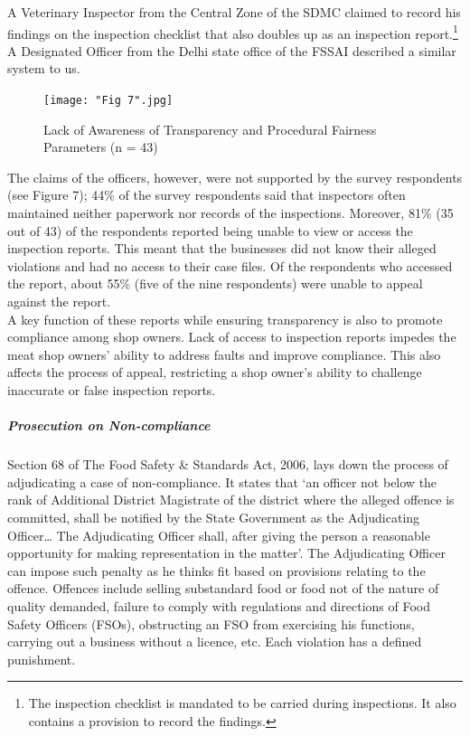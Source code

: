 \documentclass[a4paper, 12pt]{article}
\begin{document}
A Veterinary Inspector from the Central Zone of the SDMC claimed to record his findings on the inspection checklist that also doubles up as an inspection report.\footnote{The inspection checklist is mandated to be carried during inspections. It also contains a provision to record the findings.} A Designated Officer from the Delhi state office of the FSSAI described a similar system to us.

\begin{figure}[H]
\centering
\texttt{[image: "Fig 7".jpg]}
\caption[Optional Caption]{Lack of Awareness of Transparency and Procedural Fairness Parameters (n = 43)\footnotemark}
\end{figure} 

The claims of the officers, however, were not supported by the survey respondents (see Figure 7); 44\% of the survey respondents said that inspectors often maintained neither paperwork nor records of the inspections. Moreover, 81\% (35 out of 43) of the respondents reported being unable to view or access the inspection reports. This meant that the businesses did not know their alleged violations and had no access to their case files. Of the respondents who accessed the report, about 55\% (five of the nine respondents) were unable to appeal against the report. \\

A key function of these reports while ensuring transparency is also to promote compliance among shop owners. Lack of access to inspection reports impedes the meat shop owners’ ability to address faults and improve compliance. This also affects the process of appeal, restricting a shop owner’s ability to challenge inaccurate or false inspection reports.\\

\subparagraph{Prosecution on Non-compliance}

Section 68 of The Food Safety \& Standards Act, 2006, lays down the process of adjudicating a case of non-compliance. It states that ‘an officer not below the rank of Additional District Magistrate of the district where the alleged offence is committed, shall be notified by the State Government as the Adjudicating Officer… The Adjudicating Officer shall, after giving the person a reasonable opportunity for making representation in the matter’. The Adjudicating Officer can impose such penalty as he thinks fit based on provisions relating to the offence. Offences include selling substandard food or food not of the nature of quality demanded, failure to comply with regulations and directions of Food Safety Officers (FSOs), obstructing an FSO from exercising his functions, carrying out a business without a licence, etc. Each violation has a defined punishment.\\
\end{document}
